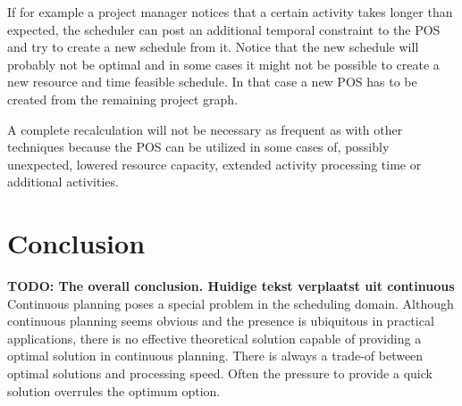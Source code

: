 \documentclass{article}
\newcommand{\TODO}[1]{{\color{red}\textbf{TODO: #1}}}
\begin{document}
If for example a project manager notices that a certain activity takes longer than expected, the scheduler can post an additional temporal constraint to the POS and try to create a new schedule from it.
Notice that the new schedule will probably not be optimal and in some cases it might not be possible to create a new resource and time feasible schedule.
In that case a new POS has to be created from the remaining project graph.


A complete recalculation will not be necessary as frequent as with other techniques because the POS can be utilized in some cases of, possibly unexpected, lowered resource capacity, extended activity processing time or additional activities.


\newpage

\section{Conclusion}
\TODO{The overall conclusion.
Huidige tekst verplaatst uit continuous}
Continuous planning poses a special problem in the scheduling domain.
Although continuous planning seems obvious and the presence is ubiquitous in practical applications, there is no effective theoretical solution capable of providing a optimal solution in continuous planning.
There is always a trade-of between optimal solutions and processing speed.
Often the pressure to provide a quick solution overrules the optimum option.

\newpage


\end{document}
